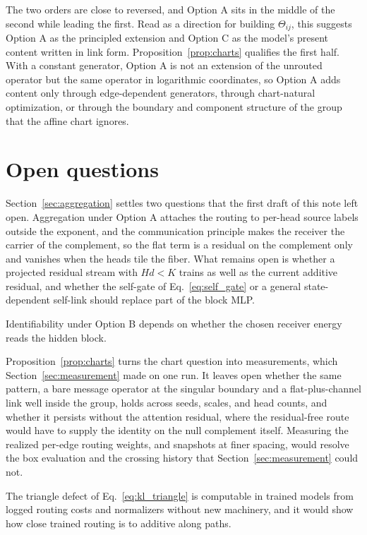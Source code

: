\documentclass[11pt]{article}
\theoremstyle{definition}
\theoremstyle{remark}
\begin{document}
The two orders are close to reversed, and Option A sits in the middle of the second while leading the first. Read as a direction for building $\Theta_{ij}$, this suggests Option A as the principled extension and Option C as the model's present content written in link form. Proposition~\ref{prop:charts} qualifies the first half. With a constant generator, Option A is not an extension of the unrouted operator but the same operator in logarithmic coordinates, so Option A adds content only through edge-dependent generators, through chart-natural optimization, or through the boundary and component structure of the group that the affine chart ignores.

\section{Open questions}
\label{sec:open}

Section~\ref{sec:aggregation} settles two questions that the first draft of this note left open. Aggregation under Option A attaches the routing to per-head source labels outside the exponent, and the communication principle makes the receiver the carrier of the complement, so the flat term is a residual on the complement only and vanishes when the heads tile the fiber. What remains open is whether a projected residual stream with $Hd<K$ trains as well as the current additive residual, and whether the self-gate of Eq.~\eqref{eq:self_gate} or a general state-dependent self-link should replace part of the block MLP.

Identifiability under Option B depends on whether the chosen receiver energy reads the hidden block.

Proposition~\ref{prop:charts} turns the chart question into measurements, which Section~\ref{sec:measurement} made on one run. It leaves open whether the same pattern, a bare message operator at the singular boundary and a flat-plus-channel link well inside the group, holds across seeds, scales, and head counts, and whether it persists without the attention residual, where the residual-free route would have to supply the identity on the null complement itself. Measuring the realized per-edge routing weights, and snapshots at finer spacing, would resolve the box evaluation and the crossing history that Section~\ref{sec:measurement} could not.

The triangle defect of Eq.~\eqref{eq:kl_triangle} is computable in trained models from logged routing costs and normalizers without new machinery, and it would show how close trained routing is to additive along paths.
\end{document}

